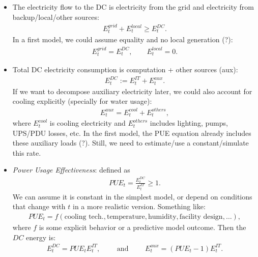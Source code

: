 \documentclass{article}
\begin{document}
\begin{itemize}
    \begin{itemize}
        \item The electricity flow to the DC is electricity from the grid and electricity from backup/local/other sources:
        \begin{align*}
            E_t^{grid}+E_t^{local} \geq E_t^{DC}.
        \end{align*}
        In a first model, we could assume equality and no local generation (?):
        \begin{align*}
            E_t^{grid}=E_t^{DC},
            \qquad
            E_t^{local}=0.
        \end{align*}

        \item Total DC electricity consumption is computation + other sources (aux):
        \begin{align*}
            E_t^{DC}:=E_t^{IT}+E_t^{aux}.
        \end{align*}
        If we want to decompose auxiliary electricity later, we could also account for cooling explicitly (specially for water usage):
        \begin{align*}
            E_t^{aux}=E_t^{cool}+E_t^{others},
        \end{align*}
        where $E_t^{cool}$ is cooling electricity and $E_t^{others}$ includes lighting, pumps,   UPS/PDU losses, etc. In the first model, the PUE equation already includes these auxiliary loads (?). Still, we need to estimate/use a constant/simulate this rate.

        \item \textit{Power Usage Effectiveness}: defined as
        \begin{align*}
            PUE_t=\frac{E_t^{DC}}{E_t^{IT}}\geq 1.
        \end{align*}
        We can assume it is constant in the simplest model, or depend on conditions that change with $t$  in a more realistic version. Something like:
        \begin{align*}
            PUE_t=f(\text{cooling tech.},\text{temperature},\text{humidity},\text{facility design},\ldots),
        \end{align*}
        where $f$ is some explicit behavior or a predictive model outcome.
        Then the $DC$ energy is:
        \begin{align*}
            E_t^{DC}=PUE_tE_t^{IT},
            \qquad \text{ and } \qquad
            E_t^{aux}=(PUE_t-1)E_t^{IT}.
        \end{align*}
    \end{itemize}


\end{itemize}
\end{document}
